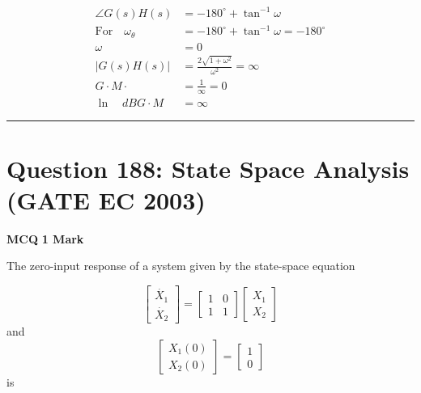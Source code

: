 \documentclass[11pt,a4paper]{article}
\begin{document}
\begin{tcolorbox}[solbox, title=Detailed Solution -- Question 187]
\[
\begin{aligned} \angle G(s) H(s) &=-180^{\circ}+\tan ^{-1} \omega \\ \text{For}\quad\omega_{\theta} &=-180^{\circ}+\tan ^{-1} \omega=-180^{\circ} \\ \omega &=0 \\ |G(s) H(s)| &=\frac{2 \sqrt{1+\omega^{2}}}{\omega^{2}}=\infty \\ G \cdot M \cdot &=\frac{1}{\infty}=0 \\ \ln \quad d B G \cdot M &=\infty \end{aligned}
\]
\end{tcolorbox}

\vspace{1.5em}
\hrule
\vspace{1.5em}

\section*{Question 188: State Space Analysis (GATE EC 2003)}
\noindent \textbf{\color{primary}MCQ} \hfill \textbf{\color{secondary}1 Mark}


\noindent The zero-input response of a system given by the state-space equation 

\[
\begin{bmatrix} \dot{X_1}\\\dot{X_2} \end{bmatrix}=\begin{bmatrix} 1 &0 \\ 1& 1 \end{bmatrix}\begin{bmatrix} X_1\\X_2 \end{bmatrix}
\]
 and 
\[
\begin{bmatrix} X_1(0)\\X_2(0) \end{bmatrix}=\begin{bmatrix} 1\\0 \end{bmatrix}
\]
 is
\end{document}
